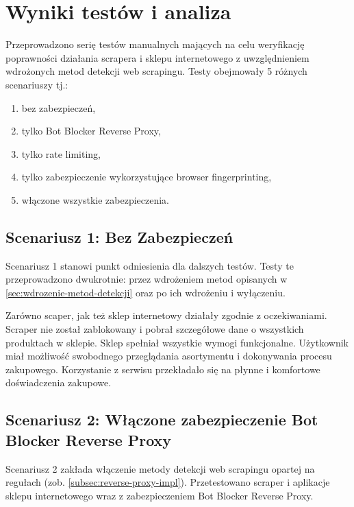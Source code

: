 \newpage


\section{Wyniki testów i analiza}\label{sec:testy}

Przeprowadzono serię testów manualnych mających na celu weryfikację poprawności działania scrapera i sklepu internetowego z uwzględnieniem wdrożonych metod detekcji web scrapingu.
Testy obejmowały 5 różnych scenariuszy tj.:
\begin{enumerate}[label={\large$\bullet$ scenariusz \arabic*:},labelindent=\parindent, leftmargin=*]
    \item bez zabezpieczeń,
    \item tylko Bot Blocker Reverse Proxy,
    \item tylko rate limiting,
    \item tylko zabezpieczenie wykorzystujące browser fingerprinting,
    \item włączone wszystkie zabezpieczenia.
\end{enumerate}

\subsection{Scenariusz 1: Bez Zabezpieczeń}\label{subsec:scenariusz-1:-wyaczone-zabezpieczenia}

Scenariusz 1 stanowi punkt odniesienia dla dalszych testów.
Testy te przeprowadzono dwukrotnie:
przez wdrożeniem metod opisanych w \autoref{sec:wdrozenie-metod-detekcji}
oraz po ich wdrożeniu i wyłączeniu.

Zarówno scaper, jak też sklep internetowy działały zgodnie z oczekiwaniami.
Scraper nie został zablokowany i pobrał szczegółowe dane o wszystkich produktach w sklepie.
Sklep spełniał wszystkie wymogi funkcjonalne.
Użytkownik miał możliwość swobodnego przeglądania asortymentu i dokonywania procesu zakupowego.
Korzystanie z serwisu przekładało się na płynne i komfortowe doświadczenia zakupowe.

\subsection{Scenariusz 2: Włączone zabezpieczenie Bot Blocker Reverse Proxy}\label{subsec:scenariusz-3:-waczone-zabezpieczenie-reverse-proxy-bot-blocker}

Scenariusz 2 zakłada włączenie metody detekcji web scrapingu opartej na regułach (zob. \autoref{subsec:reverse-proxy-impl}).
Przetestowano scraper i aplikacje sklepu internetowego wraz z zabezpieczeniem Bot Blocker Reverse Proxy.

